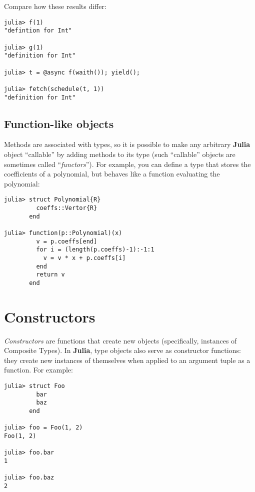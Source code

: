 \documentclass[
]{article}
\begin{document}
Compare how these results differ:

\begin{verbatim}
julia> f(1)
"defintion for Int"

julia> g(1)
"definition for Int"

julia> t = @async f(waith()); yield();

julia> fetch(schedule(t, 1))
"definition for Int"
\end{verbatim}

\hypertarget{function-like-objects}{%
\subsection{Function-like objects}\label{function-like-objects}}

Methods are associated with types, so it is possible to make any
arbitrary \textbf{Julia} object ``callable'' by adding methods to its
type (such ``callable'' objects are sometimes called
``\emph{functors}''). For example, you can define a type that stores the
coefficients of a polynomial, but behaves like a function evaluating the
polynomial:

\begin{verbatim}
julia> struct Polynomial{R}
         coeffs::Vertor{R}
       end

julia> function(p::Polynomial)(x)
         v = p.coeffs[end]
         for i = (length(p.coeffs)-1):-1:1
           v = v * x + p.coeffs[i]
         end
         return v
       end
\end{verbatim}

\newpage

\hypertarget{constructors}{%
\section{Constructors}\label{constructors}}

\emph{Constructors} are functions that create new objects (specifically,
instances of Composite Types). In \textbf{Julia}, type objects also
serve as constructor functions: they create new instances of themselves
when applied to an argument tuple as a function. For example:

\begin{verbatim}
julia> struct Foo
         bar
         baz
       end

julia> foo = Foo(1, 2)
Foo(1, 2)

julia> foo.bar
1

julia> foo.baz
2
\end{verbatim}
\end{document}
